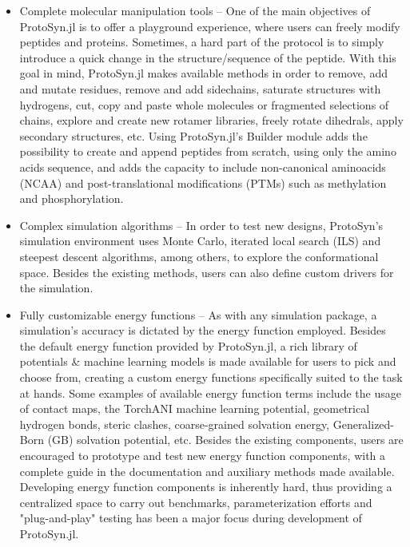 \documentclass{juliacon}
\begin{document}
\begin{itemize}
\item Complete molecular manipulation tools – One of the main objectives of ProtoSyn.jl is to offer a playground experience, where users can freely modify peptides and proteins. Sometimes, a hard part of the protocol is to simply introduce a quick change in the structure/sequence of the peptide. With this goal in mind, ProtoSyn.jl makes available methods in order to remove, add and mutate residues, remove and add sidechains, saturate structures with hydrogens, cut, copy and paste whole molecules or fragmented selections of chains, explore and create new rotamer libraries, freely rotate dihedrals, apply secondary structures, etc. Using ProtoSyn.jl’s Builder module adds the possibility to create and append peptides from scratch, using only the amino acids sequence, and adds the capacity to include non-canonical aminoacids (NCAA) and post-translational modifications (PTMs) such as methylation and phosphorylation.\vspace{5mm}
\item Complex simulation algorithms – In order to test new designs, ProtoSyn’s simulation environment uses Monte Carlo, iterated local search (ILS) and steepest descent algorithms, among others, to explore the conformational space. Besides the existing methods, users can also define custom drivers for the simulation.\vspace{5mm}
\item Fully customizable energy functions – As with any simulation package, a simulation’s accuracy is dictated by the energy function employed. Besides the default energy function provided by ProtoSyn.jl, a rich library of potentials \& machine learning models is made available for users to pick and choose from, creating a custom energy functions specifically suited to the task at hands. Some examples of available energy function terms include the usage of contact maps, the TorchANI machine learning potential, geometrical hydrogen bonds, steric clashes, coarse-grained solvation energy, Generalized-Born (GB) solvation potential, etc. Besides the existing components, users are encouraged to prototype and test new energy function components, with a complete guide in the documentation and auxiliary methods made available. Developing energy function components is inherently hard, thus providing a centralized space to carry out benchmarks, parameterization efforts and "plug-and-play" testing has been a major focus during development of ProtoSyn.jl.\vspace{5mm}

\end{itemize}
\end{document}
